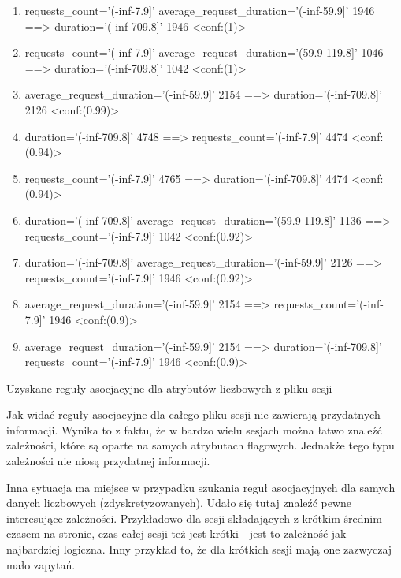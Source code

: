 \documentclass[../EDI_Task1_Karwowski_Kowalewski.tex]{subfiles}
\begin{document}
{    \begin{table}[!htbp]
        \footnotesize
        \begin{enumerate}
            \item requests\_count='(-inf-7.9]' average\_request\_duration='(-inf-59.9]' 1946 ==> duration='(-inf-709.8]' 1946 <conf:(1)>
            \item requests\_count='(-inf-7.9]' average\_request\_duration='(59.9-119.8]' 1046 ==> duration='(-inf-709.8]' 1042 <conf:(1)>
            \item average\_request\_duration='(-inf-59.9]' 2154 ==> duration='(-inf-709.8]' 2126 <conf:(0.99)>
            \item duration='(-inf-709.8]' 4748 ==> requests\_count='(-inf-7.9]' 4474 <conf:(0.94)>
            \item requests\_count='(-inf-7.9]' 4765 ==> duration='(-inf-709.8]' 4474 <conf:(0.94)>
            \item duration='(-inf-709.8]' average\_request\_duration='(59.9-119.8]' 1136 ==> requests\_count='(-inf-7.9]' 1042 <conf:(0.92)>
            \item duration='(-inf-709.8]' average\_request\_duration='(-inf-59.9]' 2126 ==> requests\_count='(-inf-7.9]' 1946 <conf:(0.92)>
            \item average\_request\_duration='(-inf-59.9]' 2154 ==> requests\_count='(-inf-7.9]' 1946 <conf:(0.9)>
            \item average\_request\_duration='(-inf-59.9]' 2154 ==> duration='(-inf-709.8]' requests\_count='(-inf-7.9]' 1946 <conf:(0.9)>
        \end{enumerate}
    \caption{Uzyskane reguły asocjacyjne dla atrybutów liczbowych z pliku sesji}
    \end{table}
    \FloatBarrier

    Jak widać reguły asocjacyjne dla całego pliku sesji nie zawierają przydatnych
    informacji. Wynika to z faktu, że w bardzo wielu sesjach można łatwo znaleźć
    zależności, które są oparte na samych atrybutach flagowych. Jednakże tego typu
    zależności nie niosą przydatnej informacji.

    Inna sytuacja ma miejsce w przypadku szukania reguł asocjacyjnych dla samych danych
    liczbowych (zdyskretyzowanych). Udało się tutaj znaleźć pewne interesujące zależności.
    Przykładowo dla sesji składających z krótkim średnim czasem na stronie, czas całej
    sesji też jest krótki - jest to zależność jak najbardziej logiczna. Inny przykład to,
    że dla krótkich sesji mają one zazwyczaj mało zapytań.
}
\end{document}
